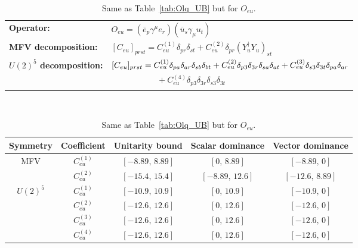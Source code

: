 \begin{table}[htbp]
\centering
{\small
\begin{tabular}{ll}
    \textbf{Operator:} &
        $\boxed{O_{eu} = (\overline e_p \gamma^\mu e_r)(\overline u_s \gamma_\mu u_t)}$ \\[0.2cm]
    \textbf{MFV decomposition:} &
        $[C_{eu}]_{prst} =
            C_{eu}^{(1)}\delta_{pr}\delta_{st}
            + C_{eu}^{(2)}\delta_{pr}(Y_u^\dagger Y_u)_{st}
            $ \\[0.15cm]
    \textbf{$U(2)^5$ decomposition:} &
        $[C_{eu}]_{prst} =
            C_{eu}^{(1)}\Pij{p}{r}{a}\Pij{s}{t}{b}
            + C_{eu}^{(2)}\delta_{p3}\delta_{3r}\Pij{s}{t}{a} + C_{eu}^{(3)}\delta_{s3}\delta_{3t}\Pij{p}{r}{a}
            $ \\
        & $\phantom{[C_{eu}]_{prst} ={}}+ C_{eu}^{(4)}\delta_{p3}\delta_{3r}\delta_{s3}\delta_{3t}$ \\
\end{tabular}
\\[0.3cm]
\renewcommand{\arraystretch}{1.3}
\begin{tabular}{ccccc}
    \toprule
    \rowcolor{hdrcolor}
    \textbf{Symmetry} & \textbf{Coefficient}
        & \textbf{Unitarity bound}
        & \textbf{Scalar dominance}
        & \textbf{Vector dominance} \\
    \midrule
    \multirow{2}{*}{MFV}
        & $C_{eu}^{(1)}$ & $[-8.89,\, 8.89]$  & $[0,\, 8.89]$      & $[-8.89,\, 0]$    \\
        & $C_{eu}^{(2)}$ & $[-15.4,\, 15.4]$  & $[-8.89,\, 12.6]$  & $[-12.6,\, 8.89]$ \\
    \midrule
    \multirow{4}{*}{$U(2)^5$}
        & $C_{eu}^{(1)}$ & $[-10.9,\, 10.9]$  & $[0,\, 10.9]$      & $[-10.9,\, 0]$    \\
        & $C_{eu}^{(2)}$ & $[-12.6,\, 12.6]$  & $[0,\, 12.6]$  & $[-12.6,\, 0]$ \\
        & $C_{eu}^{(3)}$ & $[-12.6,\, 12.6]$  & $[0,\, 12.6]$  & $[-12.6,\, 0]$ \\
        & $C_{eu}^{(4)}$ & $[-12.6,\, 12.6]$  & $[0,\, 12.6]$  & $[-12.6,\, 0]$ \\
    \bottomrule
\end{tabular}}
\caption{Same as Table~\ref{tab:Olq_UB} but for $O_{eu}$.}
\label{tab:Oeu_UB}
\end{table}

